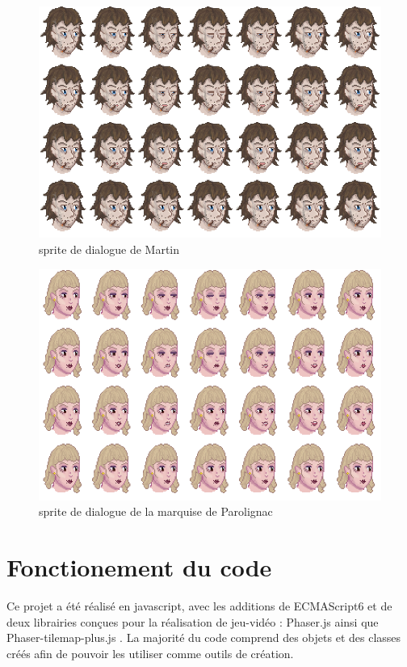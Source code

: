 \documentclass[11pt]{article}
\begin{document}
\begin{appendices}
\begin{figure}[H]
\includegraphics[scale=0.4]{martinFaceAnimation}
\centering
\caption{sprite de dialogue de Martin}
\end{figure}

\begin{figure}[H]
\includegraphics[scale=0.4]{marquiseFaceAnimation}
\centering
\caption{sprite de dialogue de la marquise de Parolignac}
\end{figure}

\newpage
\section{Fonctionement du code}
Ce projet a été réalisé en javascript, avec les additions de ECMAScript6 et de deux librairies conçues pour la réalisation de jeu-vidéo : Phaser.js ainsi que Phaser-tilemap-plus.js . La majorité du code comprend des objets et des classes créés afin de pouvoir les utiliser comme outils de création.\\


\end{appendices}
\end{document}
